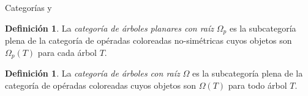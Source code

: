 \documentclass[12pt,aspectratio=169]{beamer}
\numberwithin{equation}{section}
\theoremstyle{definition}
\newtheorem{defi}[teo]{Definici\'on}
\begin{document}
\begin{frame}{Categor\'ias  y \pmb{$\Omega$}}
    \begin{defi}
        La \emph{categor\'ia de \'arboles planares con ra\'iz} $\Omega_p$ es la subcategor\'ia plena de la categor\'ia de op\'eradas coloreadas no-sim\'etricas cuyos objetos son $\Omega_p(T)$ para cada \'arbol $T$.
    
    \end{defi}
    \begin{defi}
        La \emph{categor\'ia de \'arboles con ra\'iz} $\Omega$ es la subcategor\'ia plena de la categor\'ia de op\'eradas coloreadas cuyos objetos son $\Omega(T)$ para todo \'arbol $T$.
    
    \end{defi}
\end{frame}
\end{document}
